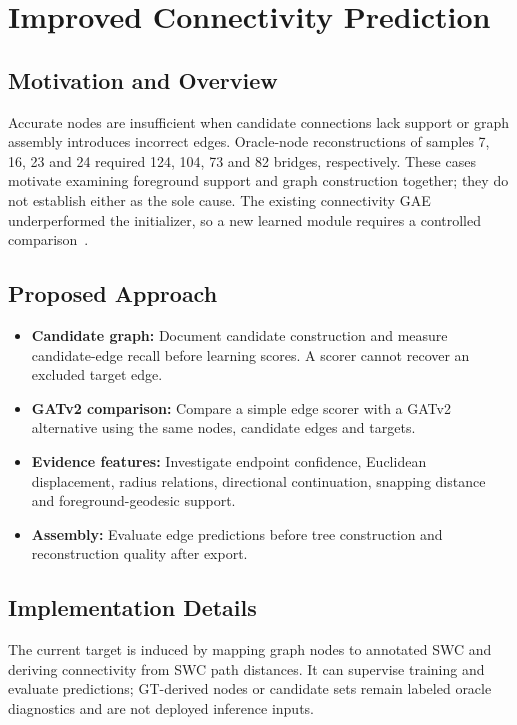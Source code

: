 \documentclass[11pt,a4paper]{article}
\begin{document}
\section{Improved Connectivity Prediction}

\subsection{Motivation and Overview}
Accurate nodes are insufficient when candidate connections lack support or graph assembly introduces incorrect edges. Oracle-node reconstructions of samples 7, 16, 23 and 24 required 124, 104, 73 and 82 bridges, respectively. These cases motivate examining foreground support and graph construction together; they do not establish either as the sole cause. The existing connectivity GAE underperformed the initializer, so a new learned module requires a controlled comparison~\cite{report,diagnostics}.

\subsection{Proposed Approach}
\begin{itemize}
    \item \textbf{Candidate graph:} Document candidate construction and measure candidate-edge recall before learning scores. A scorer cannot recover an excluded target edge.
    \item \textbf{GATv2 comparison:} Compare a simple edge scorer with a GATv2 alternative using the same nodes, candidate edges and targets.
    \item \textbf{Evidence features:} Investigate endpoint confidence, Euclidean displacement, radius relations, directional continuation, snapping distance and foreground-geodesic support.
    \item \textbf{Assembly:} Evaluate edge predictions before tree construction and reconstruction quality after export.
\end{itemize}

\subsection{Implementation Details}
The current target is induced by mapping graph nodes to annotated SWC and deriving connectivity from SWC path distances. It can supervise training and evaluate predictions; GT-derived nodes or candidate sets remain labeled oracle diagnostics and are not deployed inference inputs.
\end{document}

